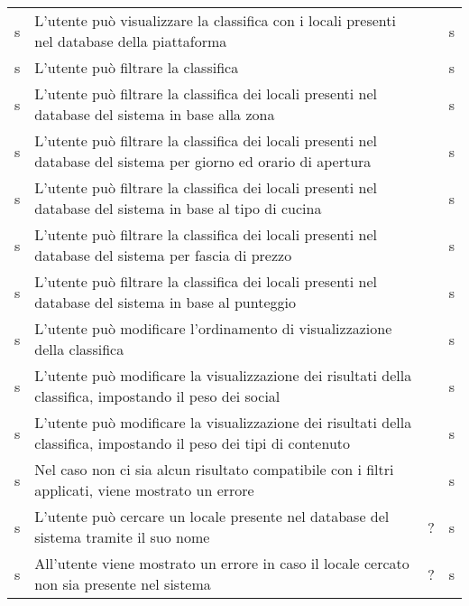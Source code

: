 \begin{longtable}{ m{}<{\centering}  m{}<{\centering}  m{}<{\centering}  m{}<{\centering}}
	 s & L’utente può visualizzare la classifica con i locali presenti nel database della piattaforma & \Ob & s\\	
	 
	 \rowcolor{gray!25} s & L’utente può filtrare la classifica & \Ob & s\\		
	 
	 s & L’utente può filtrare la classifica dei locali presenti nel database del sistema in base alla zona & \De & s\\	
	 
	 \rowcolor{gray!25} s & L’utente può filtrare la classifica dei locali presenti nel database del sistema per giorno ed orario di apertura & \De & s\\	
	 
	 s & L’utente può filtrare la classifica dei locali presenti nel database del sistema in base al tipo di cucina & \De & s\\	
	 
	 \rowcolor{gray!25} s & L’utente può filtrare la classifica dei locali presenti nel database del sistema per fascia di prezzo & \De & s\\	 
	 
	 s & L’utente può filtrare la classifica dei locali presenti nel database del sistema in base al punteggio & \De & s\\	 
	 
	 \rowcolor{gray!25} s & L’utente può modificare l’ordinamento di visualizzazione della classifica & \De & s\\	
	 
	 s & L’utente può modificare la visualizzazione dei risultati della classifica, impostando il peso dei social & \De & s\\	 
	 
	 \rowcolor{gray!25} s & L’utente può modificare la visualizzazione dei risultati della classifica, impostando il peso dei tipi di contenuto & \De & s\\	 
	 
	 s & Nel caso non ci sia alcun risultato compatibile con i filtri applicati, viene mostrato un errore & \De & s\\	 
	 
	 \rowcolor{gray!25} s & L’utente può cercare un locale presente nel database del sistema tramite il suo nome & \De ? & s\\	 
	 
	 s & All’utente viene mostrato un errore in caso il locale cercato non sia presente nel sistema & \De ? & s\\	 
	 

\end{longtable}
